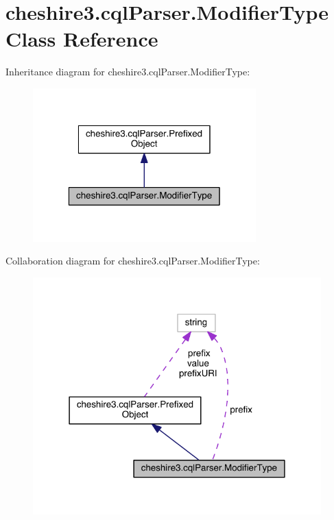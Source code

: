 \hypertarget{classcheshire3_1_1cql_parser_1_1_modifier_type}{\section{cheshire3.\-cql\-Parser.\-Modifier\-Type Class Reference}
\label{classcheshire3_1_1cql_parser_1_1_modifier_type}
}


Inheritance diagram for cheshire3.\-cql\-Parser.\-Modifier\-Type\-:
\nopagebreak
\begin{figure}[H]
\begin{center}
\leavevmode
\includegraphics[width=244pt]{classcheshire3_1_1cql_parser_1_1_modifier_type__inherit__graph}
\end{center}
\end{figure}


Collaboration diagram for cheshire3.\-cql\-Parser.\-Modifier\-Type\-:
\nopagebreak
\begin{figure}[H]
\begin{center}
\leavevmode
\includegraphics[width=315pt]{classcheshire3_1_1cql_parser_1_1_modifier_type__coll__graph}
\end{center}
\end{figure}

